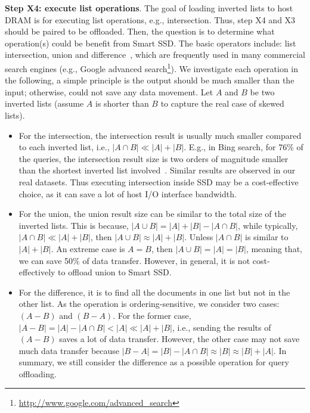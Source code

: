 \textbf{Step X4: execute list operations}. The goal of loading inverted lists to host DRAM is for executing list operations, e.g., intersection. Thus, step X4 and X3 should be paired to be offloaded. Then, the question is to determine what operation(s) could be benefit from Smart SSD. The basic operators include: list \textsf{intersection}, \textsf{union} and \textsf{difference}~\cite{M08}, which are frequently used in many commercial search engines (e.g., Google advanced search\footnote{\url{http://www.google.com/advanced_search}}). We investigate each operation in the following, a simple principle is the output should be much smaller than the input; otherwise, could not save any data movement. Let $A$ and $B$ be two inverted lists (assume $A$ is shorter than $B$ to capture the real case of skewed lists).
\begin{itemize}%
  \item For the \textsf{intersection}, the intersection result is usually much smaller compared to each inverted list, i.e., $|A\cap B| \ll |A| + |B|$. E.g., in Bing search, for 76\% of the queries, the intersection result size is two orders of magnitude smaller than the shortest inverted list involved~\cite{Ding2011}. Similar results are observed in our real datasets. Thus executing intersection inside SSD may be a cost-effective choice, as it can save a lot of host I/O interface bandwidth.

  \item For the \textsf{union}, the union result size can be similar to the total size of the inverted lists. This is because, $|A\cup B| = |A| + |B| - |A\cap B|$, while typically, $|A\cap B| \ll |A| + |B|$, then $|A\cup B| \approx |A| + |B|$. Unless $|A\cap B|$ is similar to $|A| + |B|$. An extreme case is $A = B$, then $|A\cup B| = |A| = |B|$, meaning that, we can save 50\% of data transfer. However, in general, it is not cost-effectively to offload \textsf{union} to Smart SSD.

  \item For the \textsf{difference}, it is to find all the documents in one list but not in the other list. As the operation is ordering-sensitive, we consider two cases: $(A - B)$ and $(B - A)$. For the former case, $|A - B| = |A| - |A\cap B| < |A| \ll |A| + |B|$, i.e., sending the results of $(A - B)$ saves a lot of data transfer. However, the other case may not save much data transfer because $|B - A| = |B| - |A\cap B| \approx |B| \approx |B| + |A|$. In summary, we still consider the \textsf{difference} as a possible operation for query offloading.
\end{itemize}

